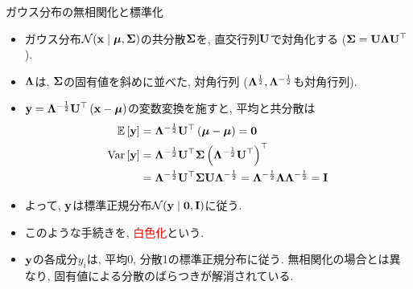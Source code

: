 \documentclass[dvipdfmx,notheorems,t]{beamer}
\begin{document}
\begin{frame}{ガウス分布の無相関化と標準化}
\begin{itemize}
  \item ガウス分布$\mathcal{N}(\vb{x} \mid \vb*{\mu}, \vb{\Sigma})$の共分散$\vb{\Sigma}$を, 直交行列$\vb{U}$で対角化する
  ($\vb{\Sigma} = \vb{U} \vb{\Lambda} \vb{U}^\top$).
  \item $\vb{\Lambda}$は, $\vb{\Sigma}$の固有値を斜めに並べた, 対角行列 ($\vb{\Lambda}^{\frac{1}{2}}, \vb{\Lambda}^{-\frac{1}{2}}$も対角行列).
  \item $\vb{y} = \vb{\Lambda}^{-\frac{1}{2}} \vb{U}^\top \left( \vb{x} - \vb*{\mu} \right)$の変数変換を施すと,
  平均と共分散は
  \begin{align*}
    \operatorname{\mathbb{E}} \left[ \vb{y} \right] &= \vb{\Lambda}^{-\frac{1}{2}} \vb{U}^\top \left( \vb*{\mu} - \vb*{\mu} \right) = \vb{0} \\
    \operatorname{Var} \left[ \vb{y} \right] &= \vb{\Lambda}^{-\frac{1}{2}} \vb{U}^\top \vb{\Sigma}
      \left( \vb{\Lambda}^{-\frac{1}{2}} \vb{U}^\top \right)^\top \\
    &= \vb{\Lambda}^{-\frac{1}{2}} \vb{U}^\top \vb{\Sigma} \vb{U} \vb{\Lambda}^{-\frac{1}{2}}
      = \vb{\Lambda}^{-\frac{1}{2}} \vb{\Lambda} \vb{\Lambda}^{-\frac{1}{2}} = \vb{I}
  \end{align*}
  \item よって, $\vb{y}$は標準正規分布$\mathcal{N}(\vb{y} \mid \vb{0}, \vb{I})$に従う.
  \item このような手続きを, \textcolor{red}{白色化}という.
  \item $\vb{y}$の各成分$y_i$は, 平均0, 分散1の標準正規分布に従う.
  無相関化の場合とは異なり, 固有値による分散のばらつきが解消されている.
\end{itemize}
\end{frame}
\end{document}
